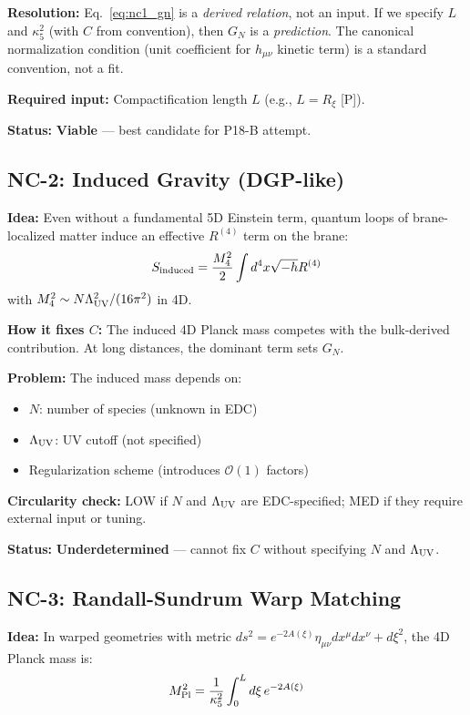 \documentclass[11pt,a4paper]{article}
\newcommand{\Post}{\textsc{[P]}}
\begin{document}
\textbf{Resolution:} Eq.~\eqref{eq:nc1_gn} is a \textit{derived relation},
not an input. If we specify $L$ and $\kappa_5^2$ (with $C$ from convention),
then $G_N$ is a \textit{prediction}. The canonical normalization condition
(unit coefficient for $h_{\mu\nu}$ kinetic term) is a standard convention,
not a fit.

\textbf{Required input:} Compactification length $L$ (e.g., $L = R_\xi$ \Post).

\textbf{Status:} \textbf{Viable} --- best candidate for P18-B attempt.

\subsection{NC-2: Induced Gravity (DGP-like)}

\textbf{Idea:} Even without a fundamental 5D Einstein term, quantum loops of
brane-localized matter induce an effective $R^{(4)}$ term on the brane:
\[
S_{\rm induced} = \frac{M_4^2}{2} \int d^4x \sqrt{-h} R^{(4)}
\]
with $M_4^2 \sim N \Lambda_{\rm UV}^2 / (16\pi^2)$ in 4D.

\textbf{How it fixes $C$:} The induced 4D Planck mass competes with the
bulk-derived contribution. At long distances, the dominant term sets $G_N$.

\textbf{Problem:} The induced mass depends on:
\begin{itemize}
\item $N$: number of species (unknown in EDC)
\item $\Lambda_{\rm UV}$: UV cutoff (not specified)
\item Regularization scheme (introduces $\mathcal{O}(1)$ factors)
\end{itemize}

\textbf{Circularity check:} LOW if $N$ and $\Lambda_{\rm UV}$ are EDC-specified;
MED if they require external input or tuning.

\textbf{Status:} \textbf{Underdetermined} --- cannot fix $C$ without specifying
$N$ and $\Lambda_{\rm UV}$.

\subsection{NC-3: Randall-Sundrum Warp Matching}

\textbf{Idea:} In warped geometries with metric
$ds^2 = e^{-2A(\xi)} \eta_{\mu\nu} dx^\mu dx^\nu + d\xi^2$,
the 4D Planck mass is:
\[
M_{\rm Pl}^2 = \frac{1}{\kappa_5^2} \int_0^L d\xi\, e^{-2A(\xi)}
\]
\end{document}

